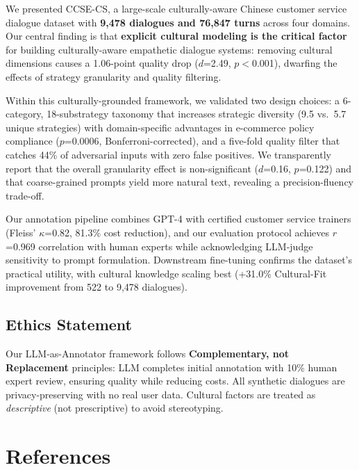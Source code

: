 \documentclass[11pt]{article}
\begin{document}
\begin{table}[t]
We presented CCSE-CS, a large-scale culturally-aware Chinese customer service dialogue dataset with \textbf{9,478 dialogues and 76,847 turns} across four domains. Our central finding is that \textbf{explicit cultural modeling is the critical factor} for building culturally-aware empathetic dialogue systems: removing cultural dimensions causes a 1.06-point quality drop ($d$=2.49, $p<$0.001), dwarfing the effects of strategy granularity and quality filtering.

Within this culturally-grounded framework, we validated two design choices: a 6-category, 18-substrategy taxonomy that increases strategic diversity (9.5 vs.\ 5.7 unique strategies) with domain-specific advantages in e-commerce policy compliance ($p$=0.0006, Bonferroni-corrected), and a five-fold quality filter that catches 44\% of adversarial inputs with zero false positives. We transparently report that the overall granularity effect is non-significant ($d$=0.16, $p$=0.122) and that coarse-grained prompts yield more natural text, revealing a precision-fluency trade-off.

Our annotation pipeline combines GPT-4 with certified customer service trainers (Fleiss' $\kappa$=0.82, 81.3\% cost reduction), and our evaluation protocol achieves $r$=0.969 correlation with human experts while acknowledging LLM-judge sensitivity to prompt formulation. Downstream fine-tuning confirms the dataset's practical utility, with cultural knowledge scaling best (+31.0\% Cultural-Fit improvement from 522 to 9,478 dialogues).

\subsection*{Ethics Statement}

Our LLM-as-Annotator framework follows \textbf{Complementary, not Replacement} principles: LLM completes initial annotation with 10\% human expert review, ensuring quality while reducing costs. All synthetic dialogues are privacy-preserving with no real user data. Cultural factors are treated as \textit{descriptive} (not prescriptive) to avoid stereotyping.


\section*{References}


\end{table}
\end{document}
